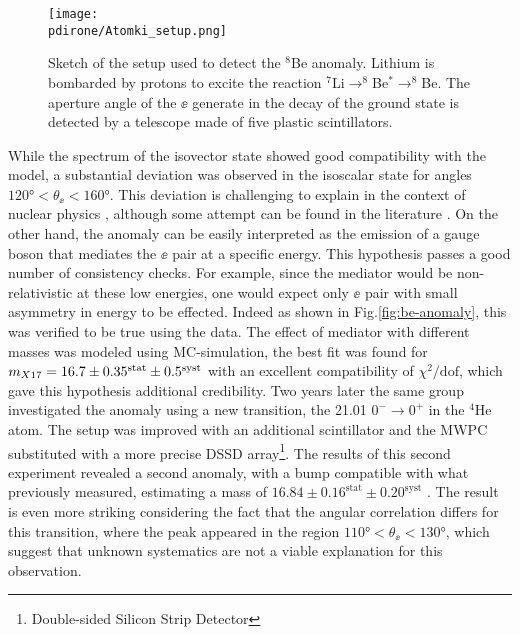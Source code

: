 \begin{figure}[htb!]
  \centering
  \texttt{[image: \\pdirone/Atomki\_setup.png]}
  \caption[Sketch of the setup used to detect the $^8$Be anomaly.]{Sketch of the setup used to detect the $^8$Be anomaly. Lithium is bombarded by protons to excite the reaction $^7$Li$\to ^8$Be$^* \to ^8$Be. The aperture angle of the $\ee$ generate in the decay of the ground state is detected by a telescope made of five plastic scintillators. \cite{PhysRevD.95.035017}}
  \label{fig:x17-setup}
\end{figure}

While the spectrum of the isovector state showed good compatibility with the model, a substantial deviation was observed in the isoscalar state for angles $120 \si{\degree} < \theta_{\ee} < 160 \si{\degree}$. This deviation is challenging to explain in the context of nuclear physics \cite{Krasznahorkay:2015iga}, although some attempt can be found in the literature \cite{Zhang:2017zap,Koch:2020ouk}. On the other hand, the anomaly can be easily interpreted as the emission of a gauge boson that mediates the $\ee$ pair at a specific energy. This hypothesis passes a good number of consistency checks. For example, since the mediator would be non-relativistic at these low energies, one would expect only $\ee$ pair with small asymmetry in energy to be effected. Indeed as shown in Fig.\ref{fig:be-anomaly}, this was verified to be true using the data. The effect of mediator with different masses was modeled using MC-simulation, the best fit was found for $m_{X17} = 16.7 \pm 0.35^{\textrm{stat}} \pm 0.5^{\textrm{syst}}$ with an excellent compatibility of $\chi^2/\textrm{dof}$, which gave this hypothesis additional credibility. Two years later the same group investigated the anomaly using a new transition, the 21.01 \mev $0^- \to 0^+$ in the $^4$He atom. The setup was improved with an additional scintillator and the MWPC substituted with a more precise  DSSD array\footnote{Double-sided Silicon Strip Detector}. The results of this second experiment revealed a second anomaly, with a bump compatible with what previously measured, estimating a mass of $16.84 \pm 0.16^{\textrm{stat}} \pm 0.20^{\textrm{syst}}$ \cite{Krasznahorkay:2019lyl}. The result is even more striking considering the fact that the angular correlation differs for this transition, where the peak appeared in the region $110 \si{\degree} < \theta_{\ee} < 130 \si{\degree}$, which suggest that unknown systematics are not a viable explanation for this observation.

